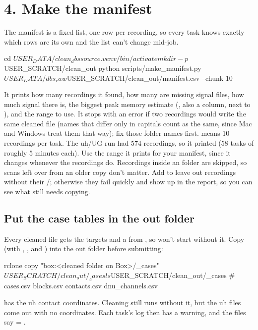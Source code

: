 \section{4. Make the manifest}
The manifest is a fixed list, one row per recording, so every task knows exactly which rows are its own and the list can't change mid-job.
\begin{codebox}
cd $USER_DATA/clean_dbs
source .venv/bin/activate
mkdir -p $USER_SCRATCH/clean_out
python scripts/make_manifest.py $USER_DATA/dbs_raw $USER_SCRATCH/clean_out/manifest.csv --chunk 10
\end{codebox}
It prints how many recordings it found, how many are missing signal files, how much signal there is, the biggest peak memory estimate (, also a column, next to ), and the  range to use. It stops with an error if two recordings would write the same cleaned file (names that differ only in capitals count as the same, since Mac and Windows treat them that way); fix those folder names first.  means 10 recordings per task. The uh/UG run had 574 recordings, so it printed  (58 tasks of roughly 5 minutes each). Use the range it prints for your manifest, since it changes whenever the recordings do. Recordings inside an  folder are skipped, so scans left over from an older copy don't matter. Add  to leave out recordings without their /; otherwise they fail quickly and show up in the report, so you can see what still needs copying.

\subsection{Put the case tables in the out folder}
Every cleaned file gets the targets and a  from , so  won't start without it. Copy  (with , ,  and ) into the out folder before submitting:
\begin{codebox}
rclone copy "box:<cleaned folder on Box>/_cases" $USER_SCRATCH/clean_out/_cases
ls $USER_SCRATCH/clean_out/_cases     # cases.csv  blocks.csv  contacts.csv  dnu_channels.csv
\end{codebox}
 has the uh contact coordinates. Cleaning still runs without it, but the uh files come out with no coordinates. Each task's  log then has a warning, and the files say  = .

